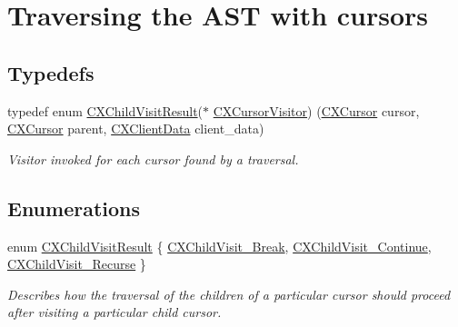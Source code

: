 \hypertarget{group__CINDEX__CURSOR__TRAVERSAL}{}\section{Traversing the A\+ST with cursors}
\label{group__CINDEX__CURSOR__TRAVERSAL}
\subsection*{Typedefs}
\begin{DoxyCompactItemize}
\item 
typedef enum \mbox{\hyperlink{group__CINDEX__CURSOR__TRAVERSAL_ga99a9058656e696b622fbefaf5207d715}{C\+X\+Child\+Visit\+Result}}($\ast$ \mbox{\hyperlink{group__CINDEX__CURSOR__TRAVERSAL_gabf842c9ee20048b596eb9dfe94bb1570}{C\+X\+Cursor\+Visitor}}) (\mbox{\hyperlink{structCXCursor}{C\+X\+Cursor}} cursor, \mbox{\hyperlink{structCXCursor}{C\+X\+Cursor}} parent, \mbox{\hyperlink{group__CINDEX_gacfa40c3de26d228c0d898403c2c21612}{C\+X\+Client\+Data}} client\+\_\+data)
\begin{DoxyCompactList}\small\item\em Visitor invoked for each cursor found by a traversal. \end{DoxyCompactList}\end{DoxyCompactItemize}
\subsection*{Enumerations}
\begin{DoxyCompactItemize}
\item 
enum \mbox{\hyperlink{group__CINDEX__CURSOR__TRAVERSAL_ga99a9058656e696b622fbefaf5207d715}{C\+X\+Child\+Visit\+Result}} \{ \mbox{\hyperlink{group__CINDEX__CURSOR__TRAVERSAL_gga99a9058656e696b622fbefaf5207d715a0c5350aa7e393b623b93338d0c6c037b}{C\+X\+Child\+Visit\+\_\+\+Break}}, 
\mbox{\hyperlink{group__CINDEX__CURSOR__TRAVERSAL_gga99a9058656e696b622fbefaf5207d715a80e20ce8a41365f0a73c6dd3177488da}{C\+X\+Child\+Visit\+\_\+\+Continue}}, 
\mbox{\hyperlink{group__CINDEX__CURSOR__TRAVERSAL_gga99a9058656e696b622fbefaf5207d715a61a23204a2aa9670ceabb7b2b17c5100}{C\+X\+Child\+Visit\+\_\+\+Recurse}}
 \}
\begin{DoxyCompactList}\small\item\em Describes how the traversal of the children of a particular cursor should proceed after visiting a particular child cursor. \end{DoxyCompactList}\end{DoxyCompactItemize}
